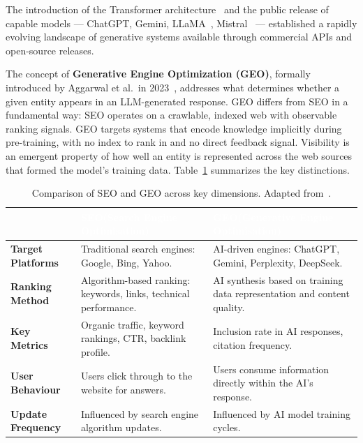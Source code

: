 The introduction of the Transformer architecture~\cite{vaswani2017attention} and the
public release of capable models — ChatGPT, Gemini, LLaMA~\cite{touvron2023llama},
Mistral~\cite{jiang2023mistral} — established a rapidly evolving landscape of
generative systems available through commercial APIs and open-source releases.

The concept of \textbf{Generative Engine Optimization (GEO)}, formally introduced by
Aggarwal et al.\ in 2023~\cite{aggarwal2023geo}, addresses what determines whether a
given entity appears in an LLM-generated response. GEO differs from SEO in a
fundamental way: SEO operates on a crawlable, indexed web with observable ranking
signals. GEO targets systems that encode knowledge implicitly during pre-training,
with no index to rank in and no direct feedback signal. Visibility is an emergent
property of how well an entity is represented across the web sources that formed the
model's training data. Table~\ref{tab:seo_vs_geo} summarizes the key distinctions.

\begin{table}[H]
\centering
\renewcommand{\arraystretch}{1.6}
\setlength{\tabcolsep}{8pt}
\begin{tabularx}{\textwidth}{
    >{\raggedright\bfseries\arraybackslash}p{2.8cm}
    >{\centering\arraybackslash}X
    >{\centering\arraybackslash}X
}
\rowcolor{white}
&
\cellcolor{seopurple}\textcolor{white}{\textbf{SEO\newline(Search Engine Optimisation)}} &
\cellcolor{geoblue}\textcolor{white}{\textbf{GEO\newline(Generative Engine Optimisation)}} \\
\midrule
\rowcolor{rowgray}
Target Platforms &
\cellcolor{seolightpurple} Traditional search engines: Google, Bing, Yahoo. &
\cellcolor{geolightblue} AI-driven engines: ChatGPT, Gemini, Perplexity, DeepSeek. \\
\rowcolor{white}
Ranking Method &
\cellcolor{seolightpurple} Algorithm-based ranking: keywords, links, technical performance. &
\cellcolor{geolightblue} AI synthesis based on training data representation and content quality. \\
\rowcolor{rowgray}
Key Metrics &
\cellcolor{seolightpurple} Organic traffic, keyword rankings, CTR, backlink profile. &
\cellcolor{geolightblue} Inclusion rate in AI responses, citation frequency. \\
\rowcolor{white}
User Behaviour &
\cellcolor{seolightpurple} Users click through to the website for answers. &
\cellcolor{geolightblue} Users consume information directly within the AI's response. \\
\rowcolor{rowgray}
Update Frequency &
\cellcolor{seolightpurple} Influenced by search engine algorithm updates. &
\cellcolor{geolightblue} Influenced by AI model training cycles. \\
\bottomrule
\end{tabularx}
\caption{Comparison of SEO and GEO across key dimensions. Adapted from~\cite{aggarwal2023geo}.}
\label{tab:seo_vs_geo}
\end{table}

